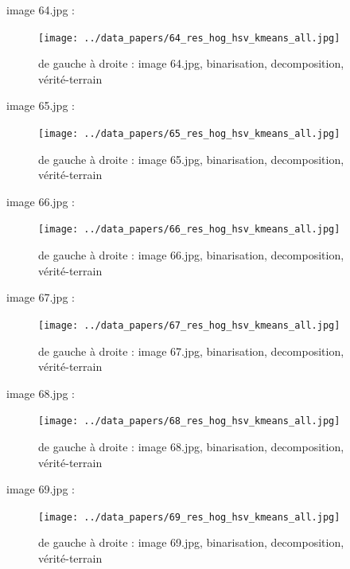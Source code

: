 \documentclass{book}
\begin{document}
image 64.jpg : 
\begin{figure}[H]
\begin{center}
\texttt{[image: ../data\_papers/64\_res\_hog\_hsv\_kmeans\_all.jpg]}
\end{center}
\caption{de gauche à droite : image 64.jpg, binarisation, decomposition, vérité-terrain}
\label{64}
\end{figure}
\clearpage


image 65.jpg : 
\begin{figure}[H]
\begin{center}
\texttt{[image: ../data\_papers/65\_res\_hog\_hsv\_kmeans\_all.jpg]}
\end{center}
\caption{de gauche à droite : image 65.jpg, binarisation, decomposition, vérité-terrain}
\label{65}
\end{figure}
\clearpage


image 66.jpg : 
\begin{figure}[H]
\begin{center}
\texttt{[image: ../data\_papers/66\_res\_hog\_hsv\_kmeans\_all.jpg]}
\end{center}
\caption{de gauche à droite : image 66.jpg, binarisation, decomposition, vérité-terrain}
\label{66}
\end{figure}
\clearpage


image 67.jpg : 
\begin{figure}[H]
\begin{center}
\texttt{[image: ../data\_papers/67\_res\_hog\_hsv\_kmeans\_all.jpg]}
\end{center}
\caption{de gauche à droite : image 67.jpg, binarisation, decomposition, vérité-terrain}
\label{67}
\end{figure}
\clearpage


image 68.jpg : 
\begin{figure}[H]
\begin{center}
\texttt{[image: ../data\_papers/68\_res\_hog\_hsv\_kmeans\_all.jpg]}
\end{center}
\caption{de gauche à droite : image 68.jpg, binarisation, decomposition, vérité-terrain}
\label{68}
\end{figure}
\clearpage


image 69.jpg : 
\begin{figure}[H]
\begin{center}
\texttt{[image: ../data\_papers/69\_res\_hog\_hsv\_kmeans\_all.jpg]}
\end{center}
\caption{de gauche à droite : image 69.jpg, binarisation, decomposition, vérité-terrain}
\label{69}
\end{figure}
\clearpage
\end{document}
